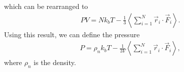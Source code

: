 which can be rearranged to
\begin{align}
    PV = Nk_bT - \frac{1}{3}\left\langle \sum_{i=1}^N \vec r_i \cdot \vec F_i\right\rangle.
\end{align}
Using this result, we can define the pressure
\begin{align}
    \label{eq:pressure_in_md}
	P = \rho_n k_bT - \frac{1}{3V}\left\langle \sum_{i=1}^N \vec r_i \cdot \vec F_i\right\rangle,
\end{align}
where $\rho_n$ is the density.

